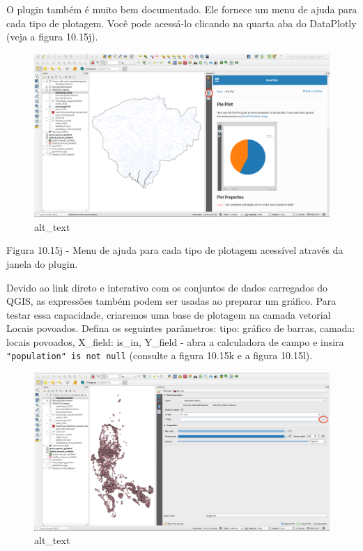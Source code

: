 \documentclass[
]{book}
\begin{document}
O plugin também é muito bem documentado. Ele fornece um menu de ajuda para cada tipo de plotagem. Você pode acessá-lo clicando na quarta aba do DataPlotly (veja a figura 10.15j).

\begin{figure}
\centering
\includegraphics{media/modulo10/fig1015_j.png}
\caption{alt\_text}
\end{figure}

Figura 10.15j - Menu de ajuda para cada tipo de plotagem acessível através da janela do plugin.

Devido ao link direto e interativo com os conjuntos de dados carregados do QGIS, as expressões também podem ser usadas ao preparar um gráfico. Para testar essa capacidade, criaremos uma base de plotagem na camada vetorial Locais povoados. Defina os seguintes parâmetros: tipo: gráfico de barras, camada: locais povoados, X\_field: is\_in, Y\_field - abra a calculadora de campo e insira \texttt{"population"\ is\ not\ null} (consulte a figura 10.15k e a figura 10.15l).

\begin{figure}
\centering
\includegraphics{media/modulo10/fig1015_k.png}
\caption{alt\_text}
\end{figure}
\end{document}
